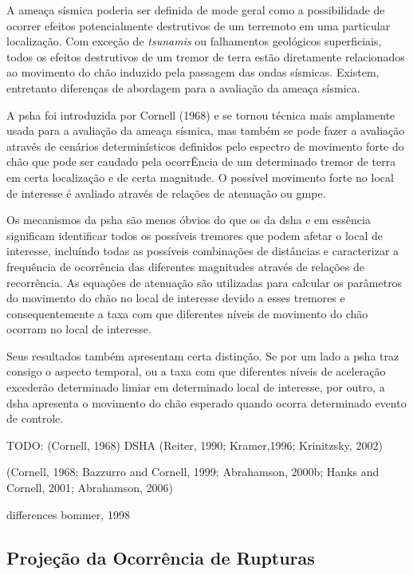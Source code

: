 A ameaça sísmica poderia ser definida de mode geral como a possibilidade de ocorrer efeitos potencialmente destrutivos
de um terremoto em uma particular localização. Com exceção de \textit{tsunamis} ou falhamentos geológicos superficiais,
todos os efeitos destrutivos de um tremor de terra estão diretamente relacionados ao movimento do chão induzido pela
passagem das ondas sísmicas. Existem, entretanto diferenças de abordagem para a avaliação da ameaça sísmica.

A \gls{psha} foi introduzida por Cornell (1968) e se tornou técnica mais amplamente usada para a avaliação da
ameaça sísmica, mas também se pode fazer a avaliação através de cenários determinísticos definidos pelo espectro de
movimento forte do chão que pode ser caudado pela ocorrÊncia de um determinado tremor de terra em certa localização e
de certa magnitude. O possível movimento forte no local de interesse é avaliado através de relações de atenuação ou
\gls{gmpe}.

Os mecanismos da \gls{psha} são menos óbvios do que os da \gls{dsha} e em essência significam identificar todos os
possíveis tremores que podem afetar o local de interesse, incluíndo todas as possíveis combinações de distâncias e
caracterizar a frequência de ocorrência das diferentes magnitudes através de relações de recorrência. As equações de
atenuação são utilizadas para calcular os parâmetros do movimento do chão no local de interesse devido a esses tremores
e consequentemente a taxa com que diferentes níveis de movimento do chão ocorram no local de interesse. 

Seus resultados também apresentam certa distinção. Se por um lado a \gls{psha} traz consigo o aspecto temporal, ou a
taxa com que diferentes níveis de aceleração excederão determinado limiar em determinado local de interesse,
por outro, a \gls{dsha} apresenta o movimento do chão esperado quando ocorra determinado evento de controle.

TODO:
(Cornell, 1968) 
DSHA  (Reiter, 1990; Kramer,1996; Krinitzsky, 2002)

(Cornell, 1968;  Bazzurro and Cornell, 1999; Abrahamson, 2000b; Hanks and Cornell, 2001; Abrahamson, 2006) 

differences bommer, 1998
 
\subsection{Projeção da Ocorrência de Rupturas}
\label{sec:projecao}

